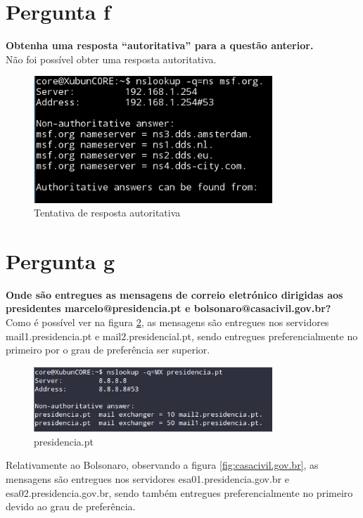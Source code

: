 \documentclass[a4paper]{report}
\begin{document}
\section{Pergunta f}
\textbf{Obtenha uma resposta “autoritativa” para a questão anterior.}\\
Não foi possível obter uma resposta autoritativa.

\begin{figure}[H]
    \centering 
    \includegraphics[width=0.8\textwidth]{images/autoritativa.png}  
    \caption{Tentativa de resposta autoritativa}
    \label{fig:autoritativa}
\end{figure}

\section{Pergunta g}
\textbf{Onde são entregues as mensagens de correio eletrónico dirigidas aos
presidentes marcelo@presidencia.pt e bolsonaro@casacivil.gov.br?}\\
Como é possível ver na figura \ref{fig:presidencia.pt}, as mensagens são
entregues nos servidores mail1.presidencia.pt e mail2.presidencial.pt, 
sendo entregues preferencialmente no primeiro por o grau de preferência
ser superior.

\begin{figure}[H]
    \centering 
    \includegraphics[width=0.8\textwidth]{images/presidencia_pt.png}  
    \caption{presidencia.pt}
    \label{fig:presidencia.pt}
\end{figure}
Relativamente ao Bolsonaro, observando a figura \ref{fig:casacivil.gov.br},
as mensagens são entregues nos servidores esa01.presidencia.gov.br e 
esa02.presidencia.gov.br, sendo também entregues preferencialmente no primeiro
devido ao grau de preferência.
\end{document}
